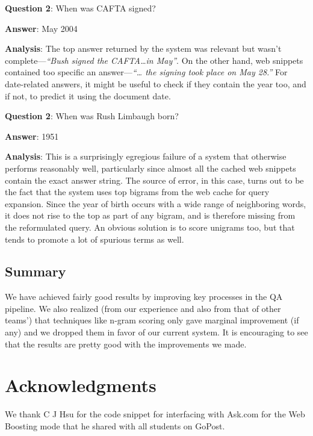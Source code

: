 \documentclass[11pt]{article}
\begin{document}
\noindent \textbf{Question 2}: When was CAFTA signed? 

\noindent \textbf{Answer}: May 2004

\noindent \textbf{Analysis}: The top answer returned by the system was relevant but wasn't complete---\emph{``Bush signed the CAFTA\ldots{}in May''}. On the other hand, web snippets contained too specific an answer---\emph{``\ldots{} the signing took place on May 28.''} For date-related answers, it might be useful to check if they contain the year too, and if not, to predict it using the document date.


\noindent \textbf{Question 2}: When was Rush Limbaugh born?

\noindent \textbf{Answer}: 1951

\noindent \textbf{Analysis}:
This is a surprisingly egregious failure of a system that otherwise performs reasonably well, particularly since almost all the cached web snippets contain the exact answer string. The source of error, in this case, turns out to be the fact that the system uses top bigrams from the web cache for query expansion. Since the year of birth occurs with a wide range of neighboring words, it does not rise to the top as part of any bigram, and is therefore missing from the reformulated query. An obvious solution is to score unigrams too, but that tends to promote a lot of spurious terms as well.

\subsection{Summary}
We have achieved fairly good results by improving key processes in the QA pipeline. We also realized (from our experience and also from that of other teams') that techniques like n-gram scoring only gave marginal improvement (if any) and we dropped them in favor of our current system. It is encouraging to see that the results are pretty good with the improvements we made.

\section*{Acknowledgments}
We thank C J Hsu for the code snippet for interfacing with Ask.com for the Web Boosting mode that he shared with all students on GoPost.

\printbibliography
\end{document}
